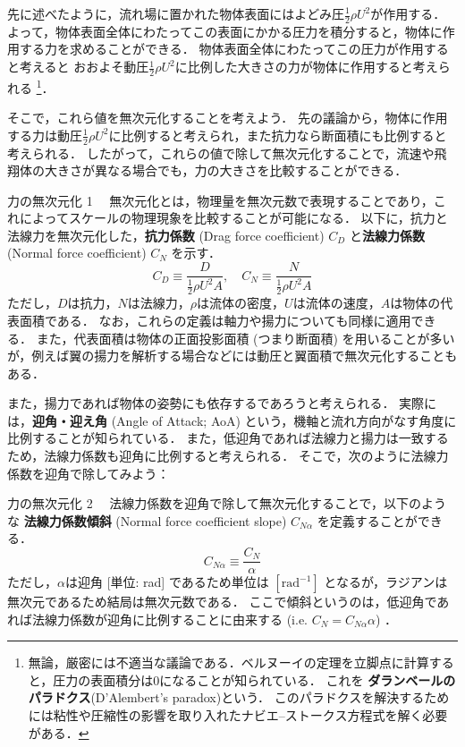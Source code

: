 \documentclass[uplatex,dvipdfmx,a4j,11pt]{jsreport}
\newcommand{\keyword}[1]{\textcolor{mainblue}{\textbf{#1}}}
\numberwithin{equation}{chapter}
\begin{document}
先に述べたように，流れ場に置かれた物体表面にはよどみ圧$\frac{1}{2}\rho U^{2}$が作用する．
よって，物体表面全体にわたってこの表面にかかる圧力を積分すると，物体に作用する力を求めることができる．
物体表面全体にわたってこの圧力が作用すると考えると
おおよそ動圧$\frac{1}{2}\rho U^{2}$に比例した大きさの力が物体に作用すると考えられる
\footnote{
  無論，厳密には不適当な議論である．ベルヌーイの定理を立脚点に計算すると，圧力の表面積分は0になることが知られている．
  これを \keyword{ダランベールのパラドクス}(D'Alembert's paradox)という．
  このパラドクスを解決するためには粘性や圧縮性の影響を取り入れたナビエ--ストークス方程式を解く必要がある．
}．

そこで，これら値を無次元化することを考えよう．
先の議論から，物体に作用する力は動圧$\frac{1}{2}\rho U^{2}$に比例すると考えられ，また抗力なら断面積にも比例すると考えられる．
したがって，これらの値で除して無次元化することで，流速や飛翔体の大きさが異なる場合でも，力の大きさを比較することができる．
\begin{definition}{力の無次元化 1}{}{}
  　無次元化とは，物理量を無次元数で表現することであり，これによってスケールの物理現象を比較することが可能になる．
  以下に，抗力と法線力を無次元化した，\keyword{抗力係数} (Drag force coefficient) $C_{D}$ と\keyword{法線力係数} (Normal force coefficient) $C_{N}$ を示す．
    \begin{equation}
      C_{D} \equiv \frac{D}{\frac{1}{2}\rho U^{2}A}, \quad C_{N} \equiv \frac{N}{\frac{1}{2}\rho U^{2}A}
    \end{equation}
  ただし，$D$は抗力，$N$は法線力，$\rho$は流体の密度，$U$は流体の速度，$A$は物体の代表面積である．
  なお，これらの定義は軸力や揚力についても同様に適用できる．
  また，代表面積は物体の正面投影面積 (つまり断面積) を用いることが多いが，例えば翼の揚力を解析する場合などには動圧と翼面積で無次元化することもある．
\end{definition}

また，揚力であれば物体の姿勢にも依存するであろうと考えられる．
実際には，\keyword{迎角・迎え角} (Angle of Attack; AoA) という，機軸と流れ方向がなす角度に比例することが知られている．
また，低迎角であれば法線力と揚力は一致するため，法線力係数も迎角に比例すると考えられる．
そこで，次のように法線力係数を迎角で除してみよう：
\begin{definition}{力の無次元化 2}{}{}
  　法線力係数を迎角で除して無次元化することで，以下のような \keyword{法線力係数傾斜} (Normal force coefficient slope) $C_{N\alpha}$ を定義することができる．
    \begin{equation}
      C_{N\alpha} \equiv \frac{C_{N}}{\alpha}
    \end{equation}
  ただし，$\alpha$は迎角 [単位: rad] であるため単位は $[\mathrm{rad}^{-1}]$ となるが，ラジアンは無次元であるため結局は無次元数である．
  ここで傾斜というのは，低迎角であれば法線力係数が迎角に比例することに由来する (i.e. $C_N = C_{N\alpha} \alpha$) ．
\end{definition}
\end{document}
